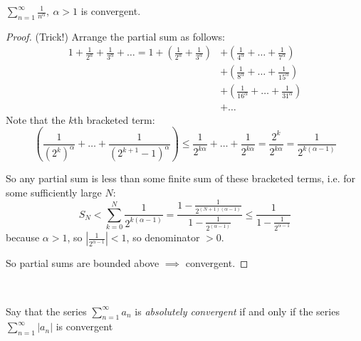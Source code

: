 \documentclass[twoside]{scrartcl}
\begin{document}
\begin{example}
$\sum_{n=1}^{\infty} \frac{1}{n^{\alpha}},~ \alpha > 1$ is convergent.
\begin{proof}
(Trick!) Arrange the partial sum as follows:
\[\begin{aligned}
1 + \frac{1}{2^\alpha} + \frac{1}{3^\alpha} + \dots  = 1 + \left(\frac{1}{2^\alpha} + \frac{1}{3^\alpha}\right) &+ \left(\frac{1}{4^\alpha} + \dots +\frac{1}{7^\alpha}\right)  \\ 
&+ \left(\frac{1}{8^\alpha} + \dots + \frac{1}{15^\alpha}\right) \\
&+ \left(\frac{1}{16^\alpha} + \dots + \frac{1}{31^\alpha}\right) \\
&+ \dots  \end{aligned}\]
Note that the $k$th bracketed term:
\[\left(\frac{1}{(2^k)^\alpha} + \dots +\frac{1}{(2^{k+1}-1)^\alpha}\right ) \leq \frac{1}{2^{k\alpha}} + \dots + \frac{1}{2^{k\alpha}} = \frac{2^k}{2^{k\alpha}} = \frac{1}{2^{k(\alpha-1)}}\]

So any partial sum is less than some finite sum of these bracketed terms, i.e. for some sufficiently large $N$: \[ S_N < \sum_{k=0}^{N} \frac{1}{2^{k(\alpha -1)}} = \frac{1-\frac{1}{2^{(N+1)(\alpha -1)}}}{1-\frac{1}{2^{(\alpha-1)}}} \leq \frac{1}{1-\frac{1}{2^{\alpha-1}}}\] because $\alpha >1$, so $\left|\frac{1}{2^{\alpha-1}}\right| < 1$, so denominator $>0$. 

So partial sums are bounded above $\implies$ convergent. 
\end{proof}	
\end{example}~

\begin{definition}
Say that the series $\sum_{n=1}^{\infty}a_n$ is \emph{absolutely convergent} if and only if the series $\sum_{n=1}^{\infty} |a_n|$ is convergent	
\end{definition}~
\end{document}
